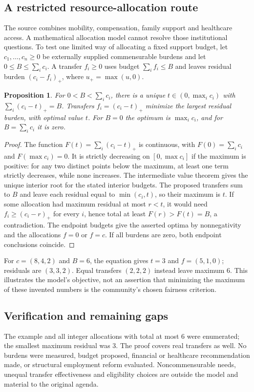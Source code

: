 \documentclass[11pt]{article}
\newtheorem{proposition}{Proposition}
\begin{document}
\subsection{A restricted resource-allocation route}
The source combines mobility, compensation, family support and healthcare access. A mathematical allocation model cannot resolve those institutional questions. To test one limited way of allocating a fixed support budget, let $c_1,\ldots,c_n\ge0$ be externally supplied commensurable burdens and let $0\le B\le\sum_i c_i$. A transfer $f_i\ge0$ uses budget $\sum_i f_i\le B$ and leaves residual burden $(c_i-f_i)_+$, where $u_+=\max(u,0)$.
\begin{proposition}
For $0<B<\sum_i c_i$, there is a unique $t\in(0,\max_i c_i)$ with $\sum_i(c_i-t)_+=B$. Transfers $f_i=(c_i-t)_+$ minimize the largest residual burden, with optimal value $t$. For $B=0$ the optimum is $\max_i c_i$, and for $B=\sum_i c_i$ it is zero.
\end{proposition}
\begin{proof}
The function $F(t)=\sum_i(c_i-t)_+$ is continuous, with $F(0)=\sum_i c_i$ and $F(\max c_i)=0$. It is strictly decreasing on $[0,\max c_i]$ if the maximum is positive: for any two distinct points below the maximum, at least one term strictly decreases, while none increases. The intermediate value theorem gives the unique interior root for the stated interior budgets. The proposed transfers sum to $B$ and leave each residual equal to $\min(c_i,t)$, so their maximum is $t$. If some allocation had maximum residual at most $r<t$, it would need $f_i\ge(c_i-r)_+$ for every $i$, hence total at least $F(r)>F(t)=B$, a contradiction. The endpoint budgets give the asserted optima by nonnegativity and the allocations $f=0$ or $f=c$. If all burdens are zero, both endpoint conclusions coincide.
\end{proof}
For $c=(8,4,2)$ and $B=6$, the equation gives $t=3$ and $f=(5,1,0)$; residuals are $(3,3,2)$. Equal transfers $(2,2,2)$ instead leave maximum 6. This illustrates the model's objective, not an assertion that minimizing the maximum of these invented numbers is the community's chosen fairness criterion.
\subsection{Verification and remaining gaps}
The example and all integer allocations with total at most 6 were enumerated; the smallest maximum residual was 3. The proof covers real transfers as well. No burdens were measured, budget proposed, financial or healthcare recommendation made, or structural employment reform evaluated. Noncommensurable needs, unequal transfer effectiveness and eligibility choices are outside the model and material to the original agenda.
\end{document}
